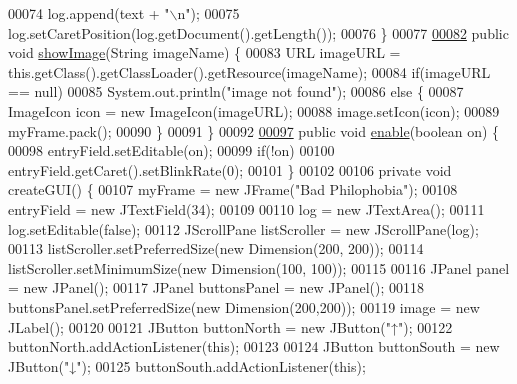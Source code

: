 \begin{DoxyCode}
00074         log.append(text + \textcolor{stringliteral}{"\(\backslash\)n"});
00075         log.setCaretPosition(log.getDocument().getLength());
00076     \}
00077 
\hypertarget{UserInterface_8java_source_l00082}{}\hyperlink{classUserInterface_ab793a0f12878c698ba3e1720a9f86f3b}{00082}     \textcolor{keyword}{public} \textcolor{keywordtype}{void} \hyperlink{classUserInterface_ab793a0f12878c698ba3e1720a9f86f3b}{showImage}(String imageName) \{
00083         URL imageURL = this.getClass().getClassLoader().getResource(imageName);
00084         \textcolor{keywordflow}{if}(imageURL == null)
00085             System.out.println(\textcolor{stringliteral}{"image not found"});
00086         \textcolor{keywordflow}{else} \{
00087             ImageIcon icon = \textcolor{keyword}{new} ImageIcon(imageURL);
00088             image.setIcon(icon);
00089             myFrame.pack();
00090         \}
00091     \}
00092 
\hypertarget{UserInterface_8java_source_l00097}{}\hyperlink{classUserInterface_ab9e499c6c847d52c8753f08d62f1adfc}{00097}     \textcolor{keyword}{public} \textcolor{keywordtype}{void} \hyperlink{classUserInterface_ab9e499c6c847d52c8753f08d62f1adfc}{enable}(\textcolor{keywordtype}{boolean} on) \{
00098         entryField.setEditable(on);
00099         \textcolor{keywordflow}{if}(!on)
00100             entryField.getCaret().setBlinkRate(0);
00101     \}
00102 
00106     \textcolor{keyword}{private} \textcolor{keywordtype}{void} createGUI() \{
00107         myFrame = \textcolor{keyword}{new} JFrame(\textcolor{stringliteral}{"Bad Philophobia"});
00108         entryField = \textcolor{keyword}{new} JTextField(34);
00109 
00110         log = \textcolor{keyword}{new} JTextArea();
00111         log.setEditable(\textcolor{keyword}{false});
00112         JScrollPane listScroller = \textcolor{keyword}{new} JScrollPane(log);
00113         listScroller.setPreferredSize(\textcolor{keyword}{new} Dimension(200, 200));
00114         listScroller.setMinimumSize(\textcolor{keyword}{new} Dimension(100, 100));
00115 
00116         JPanel panel = \textcolor{keyword}{new} JPanel();
00117         JPanel buttonsPanel = \textcolor{keyword}{new} JPanel();
00118         buttonsPanel.setPreferredSize(\textcolor{keyword}{new} Dimension(200,200));
00119         image = \textcolor{keyword}{new} JLabel();
00120 
00121         JButton buttonNorth = \textcolor{keyword}{new} JButton(\textcolor{stringliteral}{"↑"});
00122         buttonNorth.addActionListener(\textcolor{keyword}{this});
00123 
00124         JButton buttonSouth = \textcolor{keyword}{new} JButton(\textcolor{stringliteral}{"↓"});
00125         buttonSouth.addActionListener(\textcolor{keyword}{this});

\end{DoxyCode}

